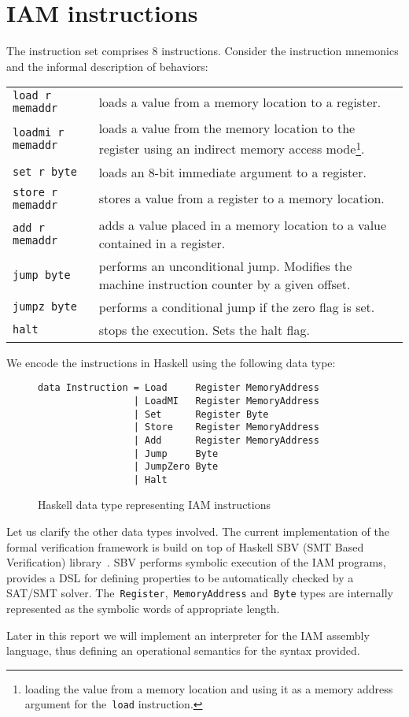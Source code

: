 \section{IAM instructions}
\label{Instructions}

The instruction set comprises 8 instructions. Consider the instruction mnemonics
and the informal description of behaviors:

\begin{longtable}{l|p{8.5cm}}
\texttt{load r memaddr}     & loads a value from a memory location to a register.\\
\texttt{loadmi r memaddr}   & loads a value from the memory location to the register using
an indirect memory access mode\footnote{loading the value from a memory location and using it as
a memory address argument for the~\texttt{load} instruction.}.\\
\texttt{set      r byte   } & loads an 8-bit immediate argument to a register.\\
\texttt{store    r memaddr} & stores a value from a register to a memory location.\\
\texttt{add      r memaddr} & adds a value placed in a memory location to a value contained in a register.\\
\texttt{jump     byte     } &  performs an unconditional jump. Modifies the machine
instruction counter by a given offset.\\
\texttt{jumpz    byte     } & performs a conditional jump if the zero flag is set.\\
\texttt{halt              } & stops the execution. Sets the halt flag.
\end{longtable}

We encode the instructions in Haskell using the following data type:

\begin{figure}[H]
\begin{verbatim}
data Instruction = Load     Register MemoryAddress
                 | LoadMI   Register MemoryAddress
                 | Set      Register Byte
                 | Store    Register MemoryAddress
                 | Add      Register MemoryAddress
                 | Jump     Byte
                 | JumpZero Byte
                 | Halt
\end{verbatim}
\caption{Haskell data type representing IAM instructions}
\label{Instruction}
\end{figure}

Let us clarify the other data types involved. The current implementation of the formal verification
framework is build on top of Haskell SBV (SMT Based Verification)
library~\cite{SBV}. SBV performs symbolic execution of the IAM programs,
provides a DSL for defining properties to be automatically checked by a SAT/SMT solver.
The~\texttt{Register},~\texttt{MemoryAddress}
and~\texttt{Byte} types are internally represented as the symbolic
words of appropriate length.

Later in this report we will implement an interpreter for the IAM assembly language,
thus defining an operational semantics for the syntax provided.
